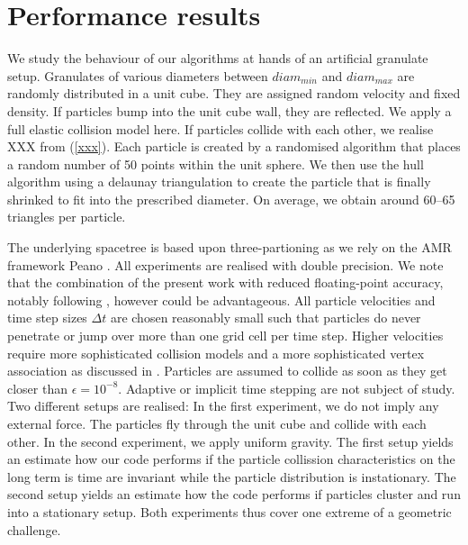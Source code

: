 \section{Performance results}
\label{section:results}

We study the behaviour of our algorithms at hands of an artificial granulate
setup. 
Granulates of various diameters between $diam_{min}$ and $diam_{max}$ are
randomly distributed in a unit cube.
They are assigned random velocity and fixed density. 
If particles bump into the unit cube wall, they are reflected. 
We apply a full elastic collision model here.
If particles collide with each other, we realise XXX from (\ref{xxx}).
Each particle is created by a randomised algorithm that places a random number
of 50 points within the unit sphere. 
We then use the hull algorithm \cite{xxxx} using a delaunay triangulation to
create the particle that is finally shrinked to fit into the prescribed
diameter.
On average, we obtain around 60--65 triangles per particle.


The underlying spacetree is based upon three-partioning as we rely on the AMR
framework Peano \cite{Software:Peano}.
All experiments are realised with double precision. 
We note that the combination of the present work with reduced
floating-point accuracy, notably following
\cite{Weinzierl:15:Compression}, however could be advantageous.
All particle velocities and time step sizes $ \Delta t$ are chosen reasonably
small such that particles do never penetrate or jump over more than one grid cell per time step.
Higher velocities require more sophisticated collision models and a more
sophisticated vertex association as discussed in \cite{Weinzierl:16:PIC}.
Particles are assumed to collide as soon as they get closer than $\epsilon =
10^{-8}$.
Adaptive or implicit time stepping \cite{xxx} are not subject of study.
Two different setups are realised: In the first experiment, we do not imply any
external force.
The particles fly through the unit cube and collide with each other.
In the second experiment, we apply uniform gravity.
The first setup yields an estimate how our code performs if the particle collission
characteristics on the long term is time are invariant while the particle
distribution is instationary.
The second setup yields an estimate how the code performs if particles cluster
and run into a stationary setup.
Both experiments thus cover one extreme of a geometric challenge.


